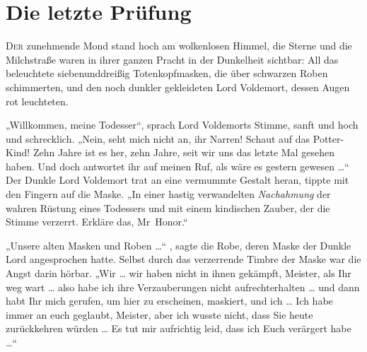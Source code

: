 \chapter{Die letzte Prüfung}

\lettrine{D}{er} zunehmende Mond stand hoch am wolkenlosen Himmel, die Sterne und die Milchstraße waren in ihrer ganzen Pracht in der Dunkelheit sichtbar: All das beleuchtete siebenunddreißig Totenkopfmasken, die über schwarzen Roben schimmerten, und den noch dunkler gekleideten Lord Voldemort, dessen Augen rot leuchteten.

„Willkommen, meine Todesser“, sprach Lord Voldemorts Stimme, sanft und hoch und schrecklich.
„Nein, seht mich nicht an, ihr Narren! Schaut auf das Potter-Kind! Zehn Jahre ist es her, zehn Jahre, seit wir uns das letzte Mal gesehen haben. Und doch antwortet ihr auf meinen Ruf, als wäre es gestern gewesen …“
Der Dunkle Lord Voldemort trat an eine vermummte Gestalt heran, tippte mit den Fingern auf die Maske.
„In einer hastig verwandelten \emph{Nachahmung} der wahren Rüstung eines Todessers und mit einem kindischen Zauber, der die Stimme verzerrt. Erkläre das, Mr~Honor.“

„Unsere alten Masken und Roben …“ , sagte die Robe, deren Maske der Dunkle Lord angesprochen hatte. Selbst durch das verzerrende Timbre der Maske war die Angst darin hörbar.
„Wir … wir haben nicht in ihnen gekämpft, Meister, als Ihr weg wart … also habe ich ihre Verzauberungen nicht aufrechterhalten … und dann habt Ihr mich gerufen, um hier zu erscheinen, maskiert, und ich … Ich habe immer an euch geglaubt, Meister, aber ich wusste nicht, dass Sie heute zurückkehren würden … Es tut mir aufrichtig leid, dass ich Euch verärgert habe …“

